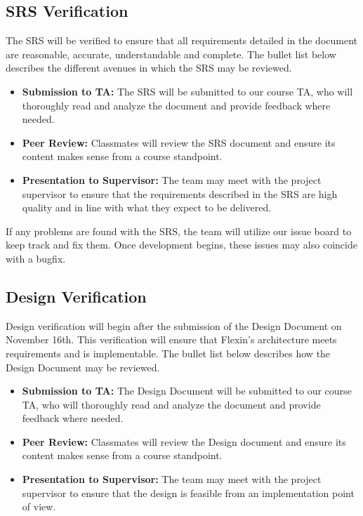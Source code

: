 \documentclass[12pt, titlepage]{article}
\begin{document}
\subsection{SRS Verification}

The SRS will be verified to ensure that all requirements detailed in the document are reasonable, accurate, understandable and complete.
The bullet list below describes the different avenues in which the SRS may be reviewed.
\begin{itemize}
  \item \textbf{Submission to TA:} The SRS will be submitted to our course TA, who will thoroughly read and analyze the document and provide feedback where needed.
  \item \textbf{Peer Review:} Classmates will review the SRS document and ensure its content makes sense from a course standpoint.
  \item \textbf{Presentation to Supervisor:} The team may meet with the project supervisor to ensure that the requirements described in the SRS are high quality and in line with what they expect to be delivered.
\end{itemize}

If any problems are found with the SRS, the team will utilize our issue board to keep track and fix them.
Once development begins, these issues may also coincide with a bugfix.

\subsection{Design Verification}

Design verification will begin after the submission of the Design Document on November 16th.
This verification will ensure that Flexin's architecture meets requirements and is implementable.
The bullet list below describes how the Design Document may be reviewed.
\begin{itemize}
  \item \textbf{Submission to TA:} The Design Document will be submitted to our course TA, who will thoroughly read and analyze the document and provide feedback where needed.
  \item \textbf{Peer Review:} Classmates will review the Design document and ensure its content makes sense from a course standpoint.
  \item \textbf{Presentation to Supervisor:} The team may meet with the project supervisor to ensure that the design is feasible from an implementation point of view.
\end{itemize}
\end{document}

